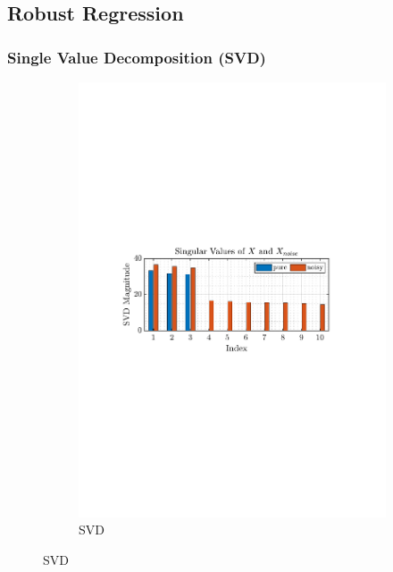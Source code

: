 \documentclass[12pt]{article}
\numberwithin{equation}{section}
\begin{document}
	
	
	\subsection{Robust Regression} \label{sec: 1-6-robust-regression} 
	 	\subsubsection{Single Value Decomposition (SVD)}
			\begin{figure}[H]
				\centering
				\begin{subfigure}{0.49\textwidth}
					\centering
					\includegraphics[trim={2.2cm 11.2cm 3.15cm  11.2cm}, clip, width=\textwidth]{../MATLAB/figures/q1_6a_fig01.pdf} 
					\captionsetup{justification=centering}
					\caption{SVD}
				\end{subfigure}

\end{figure}
\end{document}
